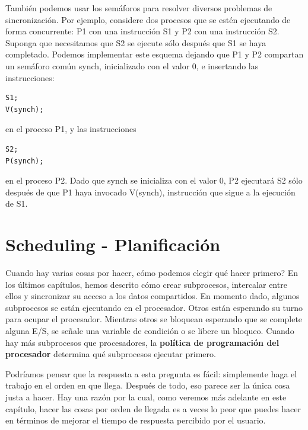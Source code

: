 \documentclass[10pt]{book}
\begin{document}
También podemos usar los semáforos para resolver diversos problemas de sincronización. Por ejemplo, considere dos procesos que se estén ejecutando de forma concurrente: {\mf P1} con una instrucción {\mf S1} y {\mf P2} con una instrucción {\mf S2}. Suponga que necesitamos que {\mf S2} se ejecute sólo después que {\mf S1} se haya completado. Podemos implementar este esquema dejando que {\mf P1} y {\mf P2} compartan un semáforo común {\mf synch}, inicializado con el valor 0, e insertando las instrucciones:


\begin{lstlisting}
S1;
V(synch);
\end{lstlisting}

en el proceso {\mf P1}, y las instrucciones

\begin{lstlisting}
S2;
P(synch);
\end{lstlisting}

en el proceso {\mf P2}. Dado que {\mf synch} se inicializa con el valor 0, {\mf P2} ejecutará {\mf S2} sólo después de que {\mf P1} haya invocado 
V(synch), instrucción que sigue a la ejecución de {\mf S1}.

\setcounter{chapter}{6}
\chapter{Scheduling - Planificación}
Cuando hay varias cosas por hacer, cómo podemos elegir qué hacer primero? En los últimos capítulos, hemos descrito cómo crear subprocesos, intercalar entre ellos y sincronizar su acceso a los datos compartidos. En momento dado, algunos subprocesos se están ejecutando en el procesador. Otros están esperando su turno para ocupar el procesador. Mientras otros se bloquean esperando que se complete alguna E/S, se señale una variable de condición o se libere un bloqueo. Cuando hay más subprocesos que procesadores, la \textbf{política de programación del procesador} determina qué subprocesos ejecutar primero.

Podríamos pensar que la respuesta a esta pregunta es fácil: simplemente haga el trabajo en el orden en que llega. Después de todo, eso parece ser la única cosa justa a hacer. Hay una razón por la cual, como veremos más adelante en este capítulo, hacer las cosas por orden de llegada es a veces lo peor que puedes hacer en términos de mejorar el tiempo de respuesta percibido por el usuario.
\end{document}
